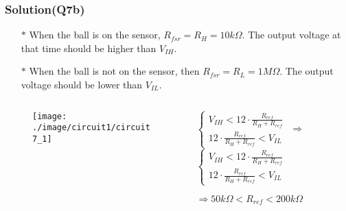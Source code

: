 \documentclass{beamer}
\begin{document}

\begin{frame}
\frametitle{Solution(Q7b)}
\begin{itemize} \itemsep1pt \parskip0pt 
  \item[$\ast$] When the ball is on the sensor, $R_{fsr} = R_H = 10k\Omega$. The output voltage at that time should be higher than $V_{IH}$.
  \item[$\ast$] When the ball is not on the sensor, then $R_{fsr} = R_L = 1M\Omega$. The output voltage should be lower than $V_{IL}$.
\end{itemize}

\begin{columns}

\begin{column}{4cm}
\begin{figure}[H]
  \centering
  \texttt{[image: ./image/circuit1/circuit7\_1]}
\end{figure}
\end{column}


\begin{column}{8.5cm}

$
\begin{cases} 
V_{IH} < 12 \cdot \frac{R_{ref}}{R_H + R_{ref}} \\
12 \cdot \frac{R_{ref}}{R_H + R_{ref}} < V_{IL}
\end{cases}
$
$\Rightarrow$
$\begin{cases} 
V_{IH} < 12 \cdot \frac{R_{ref}}{R_H + R_{ref}} \\
12 \cdot \frac{R_{ref}}{R_H + R_{ref}} < V_{IL}
\end{cases}
$

\vspace{6 mm}
$\Rightarrow 50k\Omega < R_{ref} < 200k\Omega$
\end{column}
\end{columns}

\end{frame}

\end{document}
